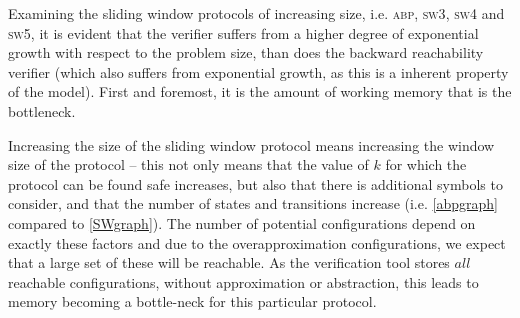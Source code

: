 Examining the sliding window protocols of increasing size, i.e. \textsc{abp}, \textsc{sw3}, \textsc{sw4} and \textsc{sw5}, it is evident that the verifier suffers from a higher degree of exponential growth with respect to the problem size, than does the backward reachability verifier (which also suffers from exponential growth, as this is a inherent property of the model). First and foremost, it is the amount of working memory that is the bottleneck.

Increasing the size of the sliding window protocol means increasing the window size of the protocol -- this not only means that the value of $k$ for which the protocol can be found safe increases, but also that there is additional symbols to consider, and that the number of states and transitions increase (i.e. \ref{abpgraph} compared to \ref{SWgraph}). The number of potential configurations depend on exactly these factors and due to the overapproximation configurations, we expect that a large set of these will be reachable. As the verification tool stores $all$ reachable configurations, without approximation or abstraction, this leads to memory becoming a bottle-neck for this particular protocol.





